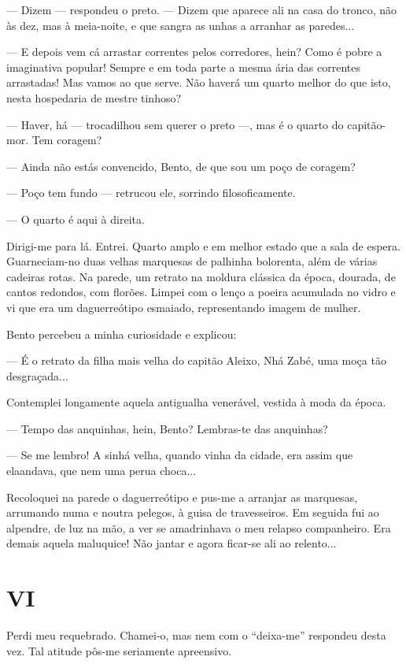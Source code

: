 --- Dizem --- respondeu o preto. --- Dizem que aparece ali na casa do
tronco, não às dez, mas à meia-noite, e que sangra as unhas a arranhar
as paredes...

--- E depois vem cá arrastar correntes pelos corredores, hein? Como é
pobre a imaginativa popular! Sempre e em toda parte a mesma ária das
correntes arrastadas! Mas vamos ao que serve. Não haverá um quarto
melhor do que isto, nesta hospedaria de mestre tinhoso?

--- Haver, há --- trocadilhou sem querer o preto ---, mas é o quarto do
capitão-mor. Tem coragem?

--- Ainda não estás convencido, Bento, de que sou um poço de coragem?

--- Poço tem fundo --- retrucou ele, sorrindo filosoficamente.

--- O quarto é aqui à direita.

Dirigi-me para lá. Entrei. Quarto amplo e em melhor estado que a sala de
espera. Guarneciam-no duas velhas marquesas de palhinha bolorenta, além
de várias cadeiras rotas. Na parede, um retrato na moldura clássica da
época, dourada, de cantos redondos, com florões. Limpei com o lenço a
poeira acumulada no vidro e vi que era um daguerreótipo esmaiado,
representando imagem de mulher.

Bento percebeu a minha curiosidade e explicou:

--- É o retrato da filha mais velha do capitão Aleixo, Nhá Zabé, uma
moça tão desgraçada...

Contemplei longamente aquela antigualha venerável, vestida à moda da
época.

--- Tempo das anquinhas, hein, Bento? Lembras-te das anquinhas?

--- Se me lembro! A sinhá velha, quando vinha da cidade, era assim que
elaandava, que nem uma perua choca...

Recoloquei na parede o daguerreótipo e pus-me a arranjar as marquesas,
arrumando numa e noutra pelegos, à guisa de travesseiros. Em seguida fui
ao alpendre, de luz na mão, a ver se amadrinhava o meu relapso
companheiro. Era demais aquela maluquice! Não jantar e agora ficar-se
ali ao relento...

\section{VI}

Perdi meu requebrado. Chamei-o, mas nem com o ``deixa-me'' respondeu
desta vez. Tal atitude pôs-me seriamente apreensivo.

